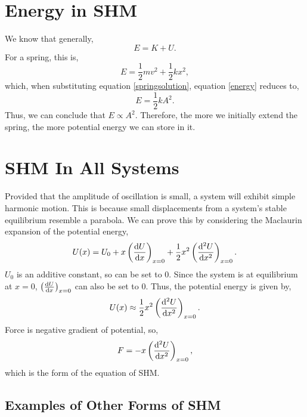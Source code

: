 \documentclass{book}
\begin{document}
\section{Energy in SHM}
We know that generally,
\begin{equation}
    E = K + U.
\end{equation}
For a spring, this is,
\begin{equation}\label{energy}
    E = \frac{1}{2}mv^2 + \frac{1}{2}kx^2,
\end{equation}
which, when substituting equation \eqref{springsolution},  equation \eqref{energy} reduces to,
\begin{equation}
    E = \frac{1}{2}kA^2.
\end{equation}
Thus, we can conclude that $E \propto A^2$. Therefore, the more we initially extend the spring, the more potential energy we can store in it. 
\section{SHM In All Systems}
Provided that the amplitude of oscillation is small, a system will exhibit simple harmonic motion. This is because small displacements from a system's stable equilibrium resemble a parabola. We can prove this by considering the Maclaurin expansion of the potential energy,
\begin{equation*}
    U(x) = U_0 + x\left( \dv{U}{x} \right)_{x=0} + \frac{1}{2}x^2\left(\dv[2]{U}{x}\right)_{x=0}.
\end{equation*}
$U_0$ is an additive constant, so can be set to 0. Since the system is at equilibrium at $x=0$, $\left(\dv{U}{x}\right)_{x=0}$ can also be set to 0. Thus, the potential energy is given by,
\begin{equation}
    U(x) \approx \frac{1}{2}x^2\left(\dv[2]{U}{x}\right)_{x=0}.
\end{equation}
Force is negative gradient of potential, so,
\begin{equation}
    F = -x\left(\dv[2]{U}{x}\right)_{x=0},
\end{equation}
which is the form of the equation of SHM.
\subsection{Examples of Other Forms of SHM}
\end{document}
